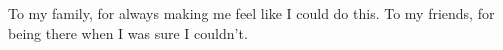 


\vspace*{3cm}

\medskip

\begin{center}
To my family, for always making me feel like I could do this.
To my friends, for being there when I was sure I couldn't. \\ \smallskip
\end{center}
